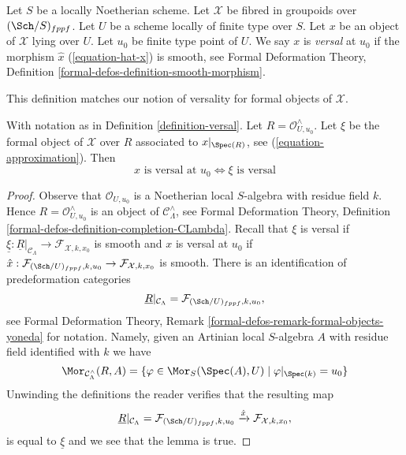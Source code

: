\begin{definition}
\label{definition-versal}
Let $S$ be a locally Noetherian scheme.
Let $\mathcal{X}$ be fibred in groupoids over $(\Sch/S)_{fppf}$.
Let $U$ be a scheme locally of finite type over $S$.
Let $x$ be an object of $\mathcal{X}$ lying over $U$.
Let $u_0$ be finite type point of $U$.
We say $x$ is {\it versal} at $u_0$ if the morphism $\hat x$
(\ref{equation-hat-x}) is smooth, see Formal Deformation Theory, Definition
\ref{formal-defos-definition-smooth-morphism}.
\end{definition}

\noindent
This definition matches our notion of versality for formal objects of
$\mathcal{X}$.

\begin{lemma}
\label{lemma-versality-matches}
With notation as in Definition \ref{definition-versal}.
Let $R = \mathcal{O}_{U, u_0}^\wedge$.
Let $\xi$ be the formal object of $\mathcal{X}$
over $R$ associated to $x|_{\Spec(R)}$, see (\ref{equation-approximation}).
Then
$$
x\text{ is versal at }u_0
\Leftrightarrow
\xi\text{ is versal}
$$
\end{lemma}

\begin{proof}
Observe that $\mathcal{O}_{U, u_0}$ is a Noetherian local $S$-algebra
with residue field $k$. Hence $R = \mathcal{O}_{U, u_0}^\wedge$ is an object of
$\mathcal{C}_\Lambda^\wedge$, see Formal Deformation Theory, Definition
\ref{formal-defos-definition-completion-CLambda}.
Recall that $\xi$ is versal if
$\underline{\xi} : \underline{R}|_{\mathcal{C}_\Lambda} \to
\mathcal{F}_{\mathcal{X}, k, x_0}$
is smooth and $x$ is versal at $u_0$ if
$\hat x : \mathcal{F}_{(\Sch/U)_{fppf}, k, u_0}
\to \mathcal{F}_{\mathcal{X}, k, x_0}$ is smooth.
There is an identification of predeformation categories
$$
\underline{R}|_{\mathcal{C}_\Lambda}
=
\mathcal{F}_{(\Sch/U)_{fppf}, k, u_0},
$$
see Formal Deformation Theory, Remark
\ref{formal-defos-remark-formal-objects-yoneda} for notation.
Namely, given an Artinian local $S$-algebra $A$ with residue field
identified with $k$ we have
$$
\Mor_{\mathcal{C}_\Lambda^\wedge}(R, A) =
\{\varphi \in \Mor_S(\Spec(A), U) \mid \varphi|_{\Spec(k)} = u_0\}
$$
Unwinding the definitions the reader verifies that the resulting map
$$
\underline{R}|_{\mathcal{C}_\Lambda} =
\mathcal{F}_{(\Sch/U)_{fppf}, k, u_0}
\xrightarrow{\hat x}
\mathcal{F}_{\mathcal{X}, k, x_0},
$$
is equal to $\underline{\xi}$ and we see that the lemma is true.
\end{proof}

